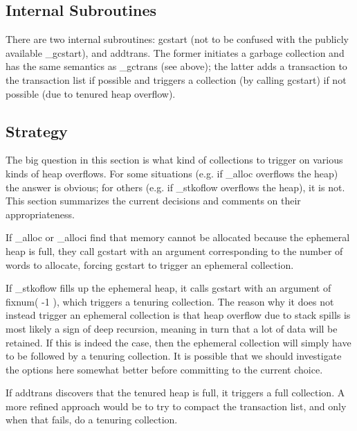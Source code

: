 \subsection{Internal Subroutines}

There are two internal subroutines: gcstart (not to be confused with
the publicly available \_gcstart), and addtrans. The former initiates a
garbage collection and has the same semantics as \_gctrans (see above);
the latter adds a transaction to the transaction list if possible and
triggers a collection (by calling gcstart) if not possible (due to tenured
heap overflow).


\subsection{Strategy}

The big question in this section is what kind of collections to
trigger on various kinds of heap overflows. For some situations (e.g.
if \_alloc overflows the heap) the answer is obvious; for others (e.g.
if \_stkoflow overflows the heap), it is not. This section summarizes
the current decisions and comments on their appropriateness.

If \_alloc or \_alloci find that memory cannot be allocated because the
ephemeral heap is full, they call gcstart with an argument corresponding
to the number of words to allocate, forcing gcstart to trigger an
ephemeral collection.

If \_stkoflow fills up the ephemeral heap, it calls gcstart with an argument
of fixnum( -1 ), which triggers a tenuring collection. The reason why
it does not instead trigger an ephemeral collection is that heap overflow
due to stack spills is most likely a sign of deep recursion, meaning
in turn that a lot of data will be retained. If this is indeed the case,
then the ephemeral collection will simply have to be followed by a tenuring
collection. It is possible that we should investigate the options here
somewhat better before committing to the current choice.

If addtrans discovers that the tenured heap is full, it triggers a full
collection. A more refined approach would be to try to compact the transaction
list, and only when that fails, do a tenuring collection.


